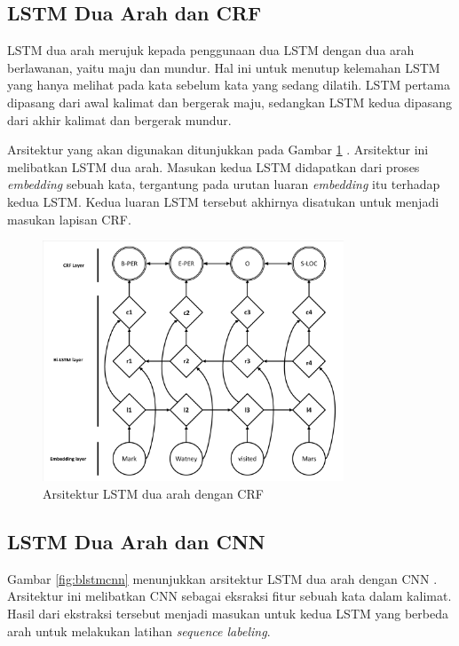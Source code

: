 \subsection{LSTM Dua Arah dan CRF}

LSTM dua arah merujuk kepada penggunaan dua LSTM dengan dua arah berlawanan, yaitu maju dan mundur. Hal ini untuk menutup kelemahan LSTM yang hanya melihat pada kata sebelum kata yang sedang dilatih. LSTM pertama dipasang dari awal kalimat dan bergerak maju, sedangkan LSTM kedua dipasang dari akhir kalimat dan bergerak mundur.

Arsitektur yang akan digunakan ditunjukkan pada Gambar \ref{fig:blstmcrf} \parencite{lample2016neural}. Arsitektur ini melibatkan LSTM dua arah. Masukan kedua LSTM didapatkan dari proses \textit{embedding} sebuah kata, tergantung pada urutan luaran \textit{embedding} itu terhadap kedua LSTM. Kedua luaran LSTM tersebut akhirnya disatukan untuk menjadi masukan lapisan CRF.

\begin{figure}[H]
	\centering
	\includegraphics[width=0.8\textwidth, trim=2 2 2 2, clip]{resources/3/blstmcrf.pdf}
	\caption{Arsitektur LSTM dua arah dengan CRF \parencite{lample2016neural}}
	\label{fig:blstmcrf}
\end{figure}

\subsection{LSTM Dua Arah dan CNN}

Gambar \ref{fig:blstmcnn} menunjukkan arsitektur LSTM dua arah dengan CNN \parencite{chiu2015named}. Arsitektur ini melibatkan CNN sebagai eksraksi fitur sebuah kata dalam kalimat. Hasil dari ekstraksi tersebut menjadi masukan untuk kedua LSTM yang berbeda arah untuk melakukan latihan \textit{sequence labeling}.

